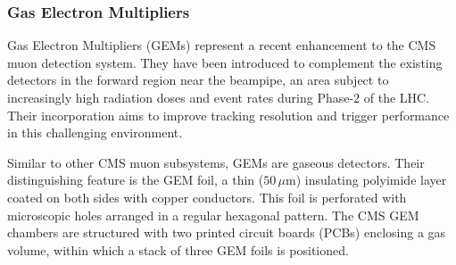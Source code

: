 


\subsubsection{Gas Electron Multipliers}

Gas Electron Multipliers (GEMs) represent a recent enhancement to the CMS muon detection system. They have been introduced to complement the existing detectors in the forward region near the beampipe, an area subject to increasingly high radiation doses and event rates during Phase-2 of the LHC. Their incorporation aims to improve tracking resolution and trigger performance in this challenging environment.  

Similar to other CMS muon subsystems, GEMs are gaseous detectors. Their distinguishing feature is the GEM foil, a thin ($50\,\mu\mathrm{m}$) insulating polyimide layer coated on both sides with copper conductors. This foil is perforated with microscopic holes arranged in a regular hexagonal pattern. The CMS GEM chambers are structured with two printed circuit boards (PCBs) enclosing a gas volume, within which a stack of three GEM foils is positioned.  

